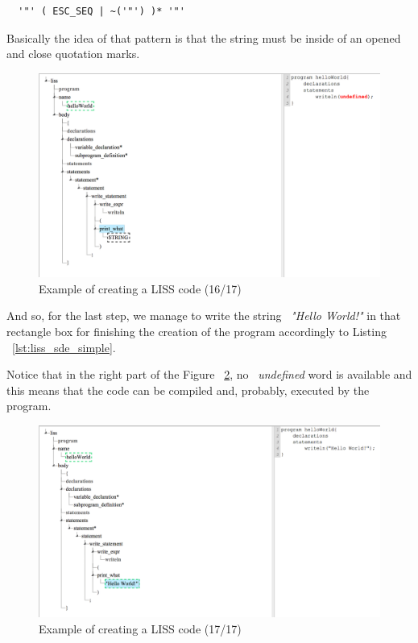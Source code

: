 \documentclass[
  oneside,
  11pt, a4paper,
  footinclude=true,
  headinclude=true,
  cleardoublepage=empty
]{scrbook}
\begin{document}
\begin{lstlisting}
  '"' ( ESC_SEQ | ~('"') )* '"'
\end{lstlisting}

Basically the idea of that pattern is that the string must be inside of an opened and close quotation marks.

\begin{figure}[h!]
  \centering
    \includegraphics[width=1\textwidth]{img/LISS-SDE_creating_program/LISS-SDE16.png}
    \caption{Example of creating a LISS code (16/17)}
    \label{fig:LISS-SDE_example_16}
\end{figure}

And so, for the last step, we manage to write the string ~\textit{"Hello World!"} in that rectangle box for finishing the creation of the program accordingly to Listing ~\ref{lst:liss_sde_simple}. 

Notice that in the right part of the Figure ~\ref{fig:LISS-SDE_example_17}, no ~\textit{undefined} word is available and this means that the code can be compiled and, probably, executed by the program.

\begin{figure}[h!]
  \centering
    \includegraphics[width=1\textwidth]{img/LISS-SDE_creating_program/LISS-SDE17.png}
    \caption{Example of creating a LISS code (17/17)}
    \label{fig:LISS-SDE_example_17}
\end{figure}
\end{document}
